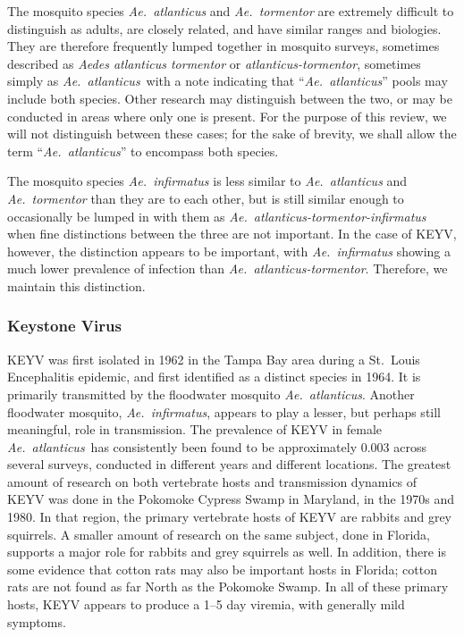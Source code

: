 \documentclass[12pt]{article}
\newcommand{\atl}{\textit{Ae.\ atlanticus}}
\begin{document}
                The mosquito species \textit{Ae.~atlanticus} and \textit{Ae.~tormentor} are extremely difficult to distinguish as adults, are closely related, and have similar ranges and biologies\cite{burkett2013mosquitoes}. They are therefore frequently lumped together in mosquito surveys, sometimes described as \textit{Aedes atlanticus tormentor}\cite{bond1966california} or \textit{atlanticus-tormentor}, sometimes simply as \atl\ with a note  indicating that ``\atl'' pools may include both species. Other research may distinguish between the two, or may be conducted in areas where only one is present. For the purpose of this review, we will not distinguish between these cases; for the sake of brevity, we shall allow the term ``\atl'' to encompass both species.

                The mosquito species \textit{Ae.~infirmatus} is less similar to \textit{Ae.~atlanticus} and \textit{Ae.~tormentor} than they are to each other, but is still similar enough to occasionally be lumped in with them as \textit{Ae.~atlanticus-tormentor-infirmatus} when fine distinctions between the three are not important. In the case of KEYV, however, the distinction appears to be important, with \textit{Ae.~infirmatus} showing a much lower prevalence of infection than \textit{Ae.~atlanticus-tormentor}.\cite{taylor1971california} Therefore, we maintain this distinction.

            \subsubsection{Keystone Virus}
                KEYV was first isolated in 1962 in the Tampa Bay area during a St.\ Louis Encephalitis epidemic\cite{chamberlain1969arbovirus, taylor1971california}, and first identified as a distinct species in 1964\cite{bond1966california}. It is primarily transmitted by the floodwater mosquito \atl. Another floodwater mosquito, \textit{Ae.~infirmatus}, appears to play a lesser, but perhaps still meaningful, role in transmission\cite{taylor1971california}. The prevalence of KEYV in female \atl\ has consistently been found to be approximately 0.003 across several surveys, conducted in different years and different locations\cite{watts1988maintenance,taylor1971california,leduc1975ecology,chamberlain1969arbovirus}. The greatest amount of research on both vertebrate hosts and transmission dynamics of KEYV was done in the Pokomoke Cypress Swamp in Maryland, in the 1970s and 1980\cite{watts1988maintenance}. In that region, the primary vertebrate hosts of KEYV are rabbits and grey squirrels\cite{watts1988maintenance}. A smaller amount of research on the same subject, done in Florida, supports a major role for rabbits and grey squirrels as well.\cite{jennings1970tamiami,jennings1968california} In addition, there is some evidence that cotton rats may also be important hosts in Florida\cite{jennings1970tamiami,taylor1971california}; cotton rats are not found as far North as the Pokomoke Swamp\cite{watts1982serologic}. In all of these primary hosts, KEYV appears to produce a 1--5 day viremia\cite{watts1988maintenance,jennings1968california}, with generally mild symptoms\cite{asdf}. %
\end{document}
